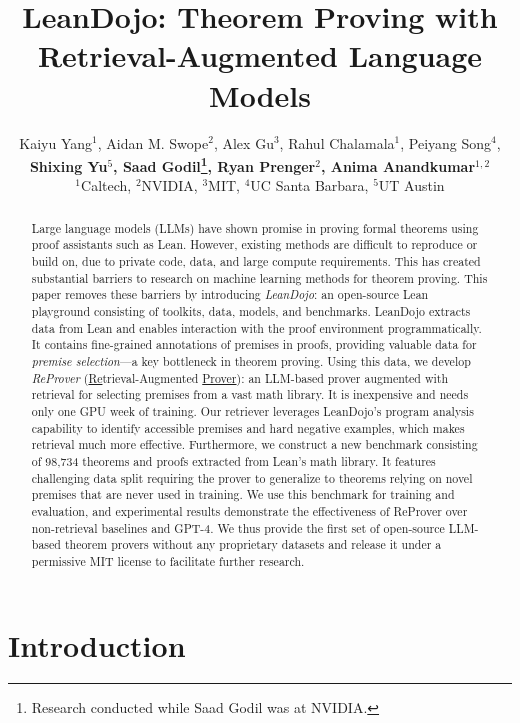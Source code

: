 \documentclass{article}
\author{%
    Kaiyu Yang$^1$, Aidan M. Swope$^{2}$, Alex Gu$^{3}$, Rahul Chalamala$^1$, Peiyang Song$^4$, \\
    \textbf{Shixing Yu$^5$, Saad Godil\thanks{Research conducted while Saad Godil was at NVIDIA.}, Ryan Prenger$^2$, Anima Anandkumar$^{1,2}$}\\
    $^1$Caltech, $^2$NVIDIA, $^3$MIT, $^4$UC Santa Barbara, $^5$UT Austin \\
    \weburl
}
\title{LeanDojo: Theorem Proving with Retrieval-Augmented Language Models}
\newcommand\name{ReProver}
\newcommand\numproofs{98,734}
\begin{document}
\maketitle


\begin{abstract}
Large language models (LLMs) have shown promise in proving formal theorems using proof assistants such as Lean. However, existing methods are difficult to reproduce or build on, due to private code, data, and large compute requirements. This has created substantial barriers to research on machine learning methods for theorem proving. This paper removes these barriers by introducing \emph{LeanDojo}: an open-source Lean playground consisting of toolkits, data, models, and benchmarks. LeanDojo extracts data from Lean and enables interaction with the proof environment programmatically. It contains fine-grained annotations of premises in proofs, providing valuable data for \emph{premise selection}---a key bottleneck in theorem proving. Using this data, we develop \emph{\name} (\underline{Re}trieval-Augmented \underline{Prover}): an LLM-based prover augmented with retrieval for selecting premises from a vast math library. It is inexpensive and needs only one GPU week of training. Our retriever leverages LeanDojo's program analysis capability to identify accessible premises and hard negative examples, which makes retrieval much more effective. Furthermore, we construct a new benchmark consisting of {\numproofs} theorems and proofs extracted from Lean's math library. It features challenging data split requiring the prover to generalize to theorems relying on novel premises that are never used in training. We use this benchmark for training and evaluation, and experimental results demonstrate the effectiveness of {\name} over non-retrieval baselines and GPT-4. We thus provide the first set of open-source LLM-based theorem provers without any proprietary datasets and release it under a permissive MIT license to facilitate further research.
\end{abstract}



\section{Introduction}
\end{document}
